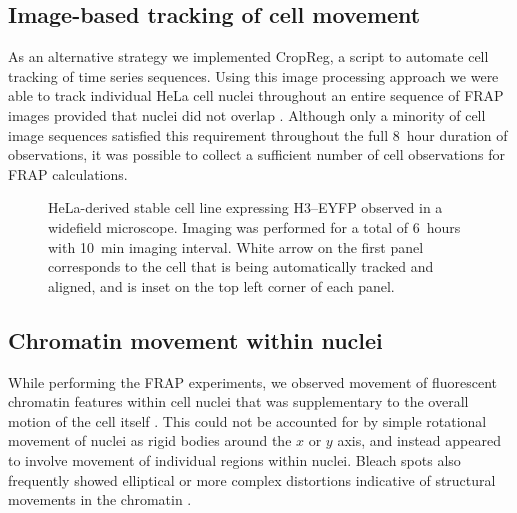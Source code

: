     \subsection{Image-based tracking of cell movement}

    As an alternative strategy we implemented CropReg, a script
    to automate cell tracking of time series sequences.
    Using this image processing approach we were
    able to track individual HeLa cell nuclei
    throughout an entire sequence of FRAP images
    provided that nuclei did not overlap .
    Although only a minority of cell image sequences satisfied this requirement
    throughout the full 8~hour duration of observations,
    it was possible to collect a sufficient number of
    cell observations for FRAP calculations.

    \begin{figure}
      \centering
        {
         HeLa-derived stable cell line expressing H3--EYFP
         observed in a widefield microscope.  Imaging was performed
         for a total of 6~hours with 10~min imaging interval.
         White arrow on the first panel corresponds to the cell that
         is being automatically tracked and aligned, and is inset on
         the top left corner of each panel.
        }
      \label{fig:kill-frap:cropreg}
    \end{figure}

  \subsection{Chromatin movement within nuclei}

    While performing the FRAP experiments, we observed movement
    of fluorescent chromatin features
    within cell nuclei that was supplementary to the overall
    motion of the cell itself .
    This could not be accounted for by simple rotational movement of nuclei
    as rigid bodies around the $x$ or $y$ axis,
    and instead appeared to involve movement of
    individual regions within nuclei.
    Bleach spots also frequently showed elliptical or more complex distortions
    indicative of structural movements in the chromatin
    .

